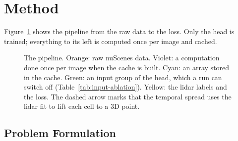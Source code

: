 %
%
\section{Method}
\label{sec:method}

Figure~\ref{fig:pipeline} shows the pipeline from the raw data to the loss. Only the head is trained; everything to its left is computed once per image and cached.

\begin{figure}[t]
  \centering
  \resizebox{\textwidth}{!}{}
  \caption{The pipeline. Orange: raw nuScenes data. Violet: a computation done once per image when the cache is built. Cyan: an array stored in the cache. Green: an input group of the head, which a run can switch off (Table~\ref{tab:input-ablation}). Yellow: the lidar labels and the loss. The dashed arrow marks that the temporal spread uses the lidar fit to lift each cell to a 3D point.}
  \label{fig:pipeline}
\end{figure}

\subsection{Problem Formulation}
\label{sec:formulation}

